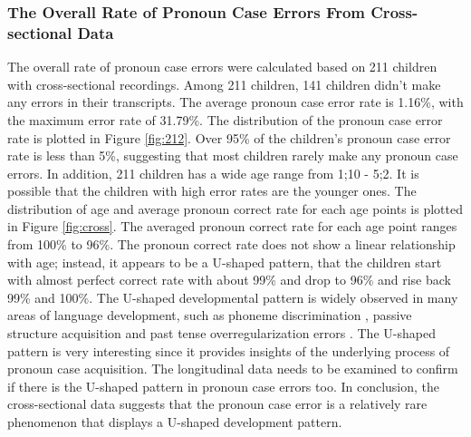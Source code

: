 \subsubsection{The Overall Rate of Pronoun Case Errors From Cross-sectional Data}
The overall rate of pronoun case errors were calculated based on 211 children with cross-sectional recordings. Among 211 children, 141 children didn't make any errors in their transcripts. The average pronoun case error rate is 1.16\%, with the maximum error rate of 31.79\%. The distribution of the pronoun case error rate is plotted in Figure \ref{fig:212}. Over 95\% of the children's pronoun case error rate is less than 5\%, suggesting that most children rarely make any pronoun case errors. In addition, 211 children has a wide age range from 1;10 - 5;2. It is possible that the children with high error rates are the younger ones. The distribution of age and average pronoun correct rate for each age points is plotted in Figure \ref{fig:cross}. The averaged pronoun correct rate for each age point ranges from 100\% to 96\%. The pronoun correct rate does not show a linear relationship with age; instead, it appears to be a U-shaped pattern, that the children start with almost perfect correct rate with about 99\% and drop to 96\% and rise back 99\% and 100\%. The U-shaped developmental pattern is widely observed in many areas of language development, such as phoneme discrimination \citep{werker1983developmental}, passive structure acquisition \citep{maratsos1974children} and past tense overregularization errors \citep{marcus1992overregularization, plunkett1993rote, jackson1997attention}. The U-shaped pattern is very interesting since it provides insights of the underlying process of pronoun case acquisition. The longitudinal data needs to be examined to confirm if there is the U-shaped pattern in pronoun case errors too. In conclusion, the cross-sectional data suggests that the pronoun case error is a relatively rare phenomenon that displays a U-shaped development pattern. 

